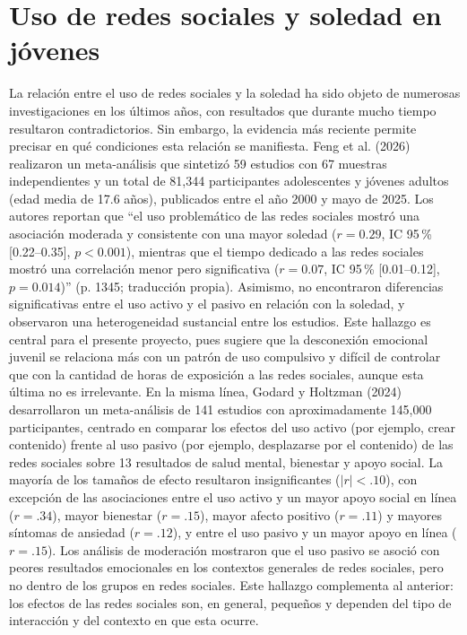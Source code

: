 \section{Uso de redes sociales y soledad en jóvenes}
La relación entre el uso de redes sociales y la soledad ha sido objeto de numerosas investigaciones en los últimos años, con resultados que durante mucho tiempo resultaron contradictorios. Sin embargo, la evidencia más reciente permite precisar en qué condiciones esta relación se manifiesta.
Feng et al. (2026) realizaron un meta-análisis que sintetizó 59 estudios con 67 muestras independientes y un total de 81,344 participantes adolescentes y jóvenes adultos (edad media de 17.6 años), publicados entre el año 2000 y mayo de 2025. Los autores reportan que ``el uso problemático de las redes sociales mostró una asociación moderada y consistente con una mayor soledad ($r = 0.29$, IC 95\,\% [0.22--0.35], $p < 0.001$), mientras que el tiempo dedicado a las redes sociales mostró una correlación menor pero significativa ($r = 0.07$, IC 95\,\% [0.01--0.12], $p = 0.014$)'' (p. 1345; traducción propia). Asimismo, no encontraron diferencias significativas entre el uso activo y el pasivo en relación con la soledad, y observaron una heterogeneidad sustancial entre los estudios. Este hallazgo es central para el presente proyecto, pues sugiere que la desconexión emocional juvenil se relaciona más con un patrón de uso compulsivo y difícil de controlar que con la cantidad de horas de exposición a las redes sociales, aunque esta última no es irrelevante.
En la misma línea, Godard y Holtzman (2024) desarrollaron un meta-análisis de 141 estudios con aproximadamente 145,000 participantes, centrado en comparar los efectos del uso activo (por ejemplo, crear contenido) frente al uso pasivo (por ejemplo, desplazarse por el contenido) de las redes sociales sobre 13 resultados de salud mental, bienestar y apoyo social. La mayoría de los tamaños de efecto resultaron insignificantes ($|r| < .10$), con excepción de las asociaciones entre el uso activo y un mayor apoyo social en línea ($r = .34$), mayor bienestar ($r = .15$), mayor afecto positivo ($r = .11$) y mayores síntomas de ansiedad ($r = .12$), y entre el uso pasivo y un mayor apoyo en línea ($r = .15$). Los análisis de moderación mostraron que el uso pasivo se asoció con peores resultados emocionales en los contextos generales de redes sociales, pero no dentro de los grupos en redes sociales. Este hallazgo complementa al anterior: los efectos de las redes sociales son, en general, pequeños y dependen del tipo de interacción y del contexto en que esta ocurre.

